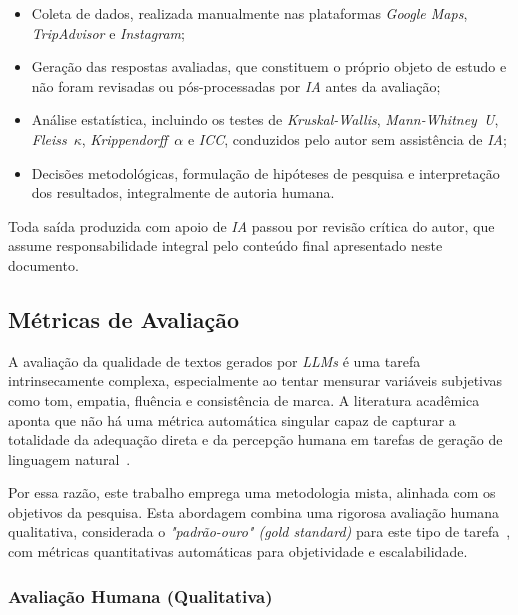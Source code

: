 \documentclass[12pt, a4paper]{article}
\numberwithin{equation}{section}
\begin{document}
\begin{itemize}

\item Coleta de dados, realizada manualmente nas plataformas \textit{Google Maps}, \textit{TripAdvisor} e \textit{Instagram};

\item Geração das respostas avaliadas, que constituem o próprio objeto de estudo e não foram revisadas ou pós-processadas por \textit{IA} antes da avaliação; 

\item Análise estatística, incluindo os testes de \textit{Kruskal-Wallis}, \textit{Mann-Whitney~U}, \textit{Fleiss}~$\kappa$, \textit{Krippendorff}~$\alpha$ e \textit{ICC}, conduzidos pelo autor sem assistência de \textit{IA};

\item Decisões metodológicas, formulação de hipóteses de pesquisa e interpretação dos resultados, integralmente de autoria humana.

\end{itemize}

Toda saída produzida com apoio de \textit{IA} passou por revisão crítica do autor, que assume responsabilidade integral pelo conteúdo final apresentado neste documento.

\subsection{Métricas de Avaliação}

A avaliação da qualidade de textos gerados por \textit{LLMs} é uma tarefa intrinsecamente complexa, especialmente ao tentar mensurar variáveis subjetivas como tom, empatia, fluência e consistência de marca. A literatura acadêmica aponta que não há uma métrica automática singular capaz de capturar a totalidade da adequação direta e da percepção humana em tarefas de geração de linguagem natural~\cite{howcroft2020twenty}.

Por essa razão, este trabalho emprega uma metodologia mista, alinhada com os objetivos da pesquisa. Esta abordagem combina uma rigorosa avaliação humana qualitativa, considerada o \textit{"padrão-ouro" (gold standard)} para este tipo de tarefa~\cite{celikyilmaz2021Evaluation}, com métricas quantitativas automáticas para objetividade e escalabilidade.

\subsubsection{Avaliação Humana (Qualitativa)}
\end{document}
